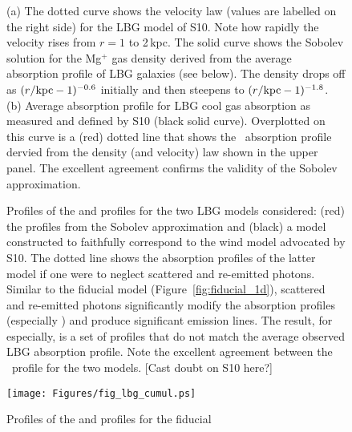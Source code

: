 \documentclass[12pt,preprint]{aastex}
\begin{document}
\begin{figure}
\caption{
(a) The dotted curve shows the velocity law (values are labelled on the
right side) for the LBG model
of S10.  Note how rapidly the velocity rises from $r =
1$ to 2\,kpc.  The solid curve shows the Sobolev solution for the
Mg$^+$ gas
density derived from 
the average absorption profile of LBG galaxies (see below).
The density drops off as $(r/{\rm kpc}-1)^{-0.6}$ initially and then
steepens to $(r/{\rm kpc}-1)^{-1.8}$.
(b) Average absorption profile for LBG cool gas absorption as
measured and defined by S10
(black solid curve).  Overplotted on this curve is a (red) dotted line that
shows the \mgiia\ absorption profile dervied from the density (and velocity)
law shown in the upper panel.  The excellent agreement confirms the
validity of the Sobolev approximation.
}
\label{fig:LBG_Sobolev}
\end{figure}

\clearpage

\begin{figure}
\caption{
Profiles of the  and  profiles for the two
LBG models considered: (red) the profiles from the 
Sobolev approximation 
and (black) a model constructed to faithfully
correspond to the wind model advocated by S10.  The dotted line
shows the absorption profiles of the latter model if one were
to neglect scattered and re-emitted photons.  Similar to the fiducial
model (Figure~\ref{fig:fiducial_1d}), scattered and re-emitted photons
significantly modify the absorption profiles (especially )
and produce significant emission lines.  
The result, for  especially, is a set of profiles that do
not match the average observed LBG absorption profile.
Note the excellent agreement
between the \mgiia\ profile for the two models. [Cast doubt on S10
here?]
}
\label{fig:LBG_spec}
\end{figure}

\begin{figure}
\texttt{[image: Figures/fig\_lbg\_cumul.ps]}
\caption{
Profiles of the  and  profiles for the fiducial
}
\label{fig:LBG_cumul}
\end{figure}
\end{document}
